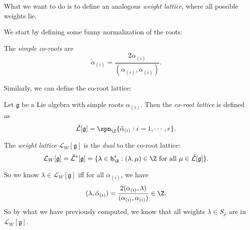 \documentclass[a4paper]{article}
\begin{document}
What we want to do is to define an analogous \emph{weight lattice}, where all possible weights lie.

We start by defining some funny normalization of the roots:
\begin{defi}
  The \emph{simple co-roots} are
  \[
    \check{\alpha}_{(i)} = \frac{2 \alpha_{(i)}}{(\alpha_{(i)},\alpha_{(i)})}.
  \]
\end{defi}
Similarly, we can define the co-root lattice:

\begin{defi}
  Let $\mathfrak{g}$ be a Lie algebra with simple roots $\alpha_{(i)}$. Then the \emph{co-root lattice} is defined as
  \[
    \check{\mathcal{L}}[\mathfrak{g}] = \spn_\Z\{\check\alpha_{(i)}: i = 1, \cdots, r\}.
  \]
\end{defi}

\begin{defi}
  The \emph{weight lattice} $\mathcal{L}_W[\mathfrak{g}]$ is the \emph{dual} to the co-root lattice:
  \[
    \mathcal{L}_W [\mathfrak{g}] = \check{\mathcal{L}}^*[\mathfrak{g}] = \{\lambda \in \mathfrak{h}^*_\R: (\lambda, \mu) \in \Z \text{ for all }\mu \in \check{\mathcal{L}}[\mathfrak{g}]\}.
  \]
\end{defi}
So we know $\lambda \in \mathcal{L}_W[\mathfrak{g}]$ iff for all $\alpha_{(i)}$, we have
\[
  (\lambda , \check{\alpha}_{(i)}) = \frac{2(\alpha_{(i)}, \lambda)}{(\alpha_{(i)}, \alpha_{(i)})} \in \Z.
\]
So by what we have previously computed, we know that all weights $\lambda \in S_\rho$ are in $\mathcal{L}_W [\mathfrak{g}]$.
\end{document}
